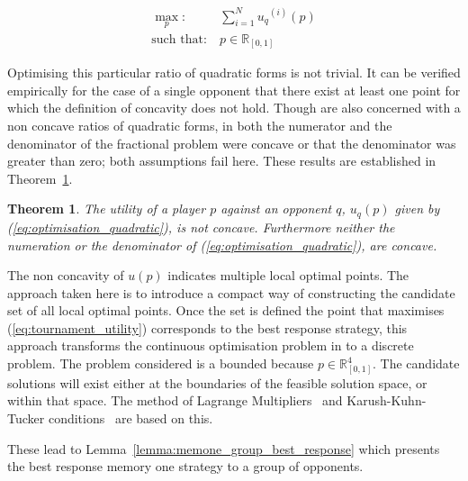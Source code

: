 \documentclass[10pt]{article}
\newcommand{\R}{\mathbb{R}}
\newtheorem{theorem}{Theorem}
\begin{document}
\begin{equation}\label{eq:mo_tournament_optimisation}
    \begin{aligned}
    \max_p: & \ \sum_{i=1} ^ {N} {u_q}^{(i)} (p)
    \\
    \text{such that}: & \ p \in \R_{[0, 1]}
    \end{aligned}
\end{equation}

Optimising this particular ratio of quadratic forms is not trivial. It can be
verified empirically for the case of a single opponent that there exist at least
one point for which the definition of concavity does not hold. Though 
\cite{Beck2009, Hongyan2014} are also concerned with a non concave ratios of
quadratic forms, in both the numerator and the denominator of
the fractional problem were concave or that the denominator was greater than
zero; both assumptions fail here. These results are established in
Theorem~\ref{theorem:concavity}.

\begin{theorem}\label{theorem:concavity}
    The utility of a player \(p\) against an opponent \(q\), \(u_q (p)\) given by
    (\ref{eq:optimisation_quadratic}), is not concave. Furthermore neither the
    numeration or the denominator of (\ref{eq:optimisation_quadratic}), are concave.
\end{theorem}

The non concavity of \(u(p)\) indicates multiple local optimal points. The
approach taken here is to introduce a compact way of constructing the candidate
set of all local optimal points. Once the set is defined the point that
maximises (\ref{eq:tournament_utility}) corresponds to the best response
strategy, this approach transforms the continuous optimisation problem in to a
discrete problem. The problem considered is a bounded because \(p \in \R^4_{[0,
1]}\). The candidate solutions will exist either at the boundaries of the
feasible solution space, or within that space. The method of Lagrange
Multipliers~\cite{bertsekas2014} and Karush-Kuhn-Tucker
conditions~\cite{Giorgi2016} are based on this.

These lead to Lemma~\ref{lemma:memone_group_best_response} which
presents the best response memory one strategy to a group of opponents.
\end{document}
